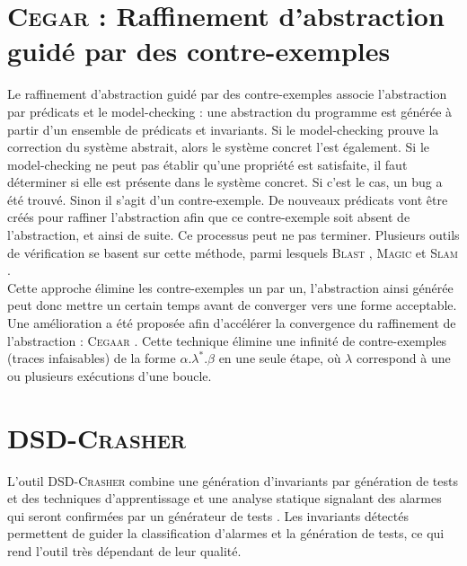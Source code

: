 \section{\textsc{Cegar} : Raffinement d'abstraction guidé par des
  contre-exemples}

Le raffinement d'abstraction guidé par des contre-exemples \cite{CEGAR} associe
l’abstraction par prédicats et le model-checking : une abstraction du programme
est générée à partir d’un ensemble de prédicats et invariants. Si le
model-checking prouve la correction du système abstrait, alors le système
concret l'est également. Si le model-checking ne peut pas établir qu'une
propriété est satisfaite, il faut déterminer si elle est présente dans le
système concret. Si c'est le cas, un bug a été trouvé. Sinon il s'agit d'un
contre-exemple. De nouveaux prédicats vont être créés pour raffiner
l'abstraction afin que ce contre-exemple soit absent de l'abstraction, et ainsi
de suite. Ce processus peut ne pas terminer. Plusieurs outils de vérification se
basent sur cette méthode, parmi lesquels \textsc{Blast} \cite{BLAST},
\textsc{Magic} \cite{MAGIC} et \textsc{Slam} \cite{SLAM}.\\

Cette approche élimine les contre-exemples un par un, l'abstraction ainsi
générée peut donc mettre un certain temps avant de converger vers une forme
acceptable. Une amélioration a été proposée afin d'accélérer la convergence du
raffinement de l'abstraction : \textsc{Cegaar} \cite{CEGAAR}. Cette technique
élimine une infinité de contre-exemples (traces infaisables) de la forme
$\alpha . \lambda^* . \beta$ en une seule étape, où $\lambda$ correspond à une
ou plusieurs exécutions d'une boucle.

\section{\textsc{DSD-Crasher}}

L'outil \textsc{DSD-Crasher} \cite{DSD-Crasher} combine une génération
d'invariants par génération de tests et des techniques d'apprentissage
\cite{discover-invariants} et une analyse statique signalant des alarmes qui
seront confirmées par un générateur de tests \cite{JCrasher}. Les invariants
détectés permettent de guider la classification d'alarmes et la génération de
tests, ce qui rend l'outil très dépendant de leur qualité.

